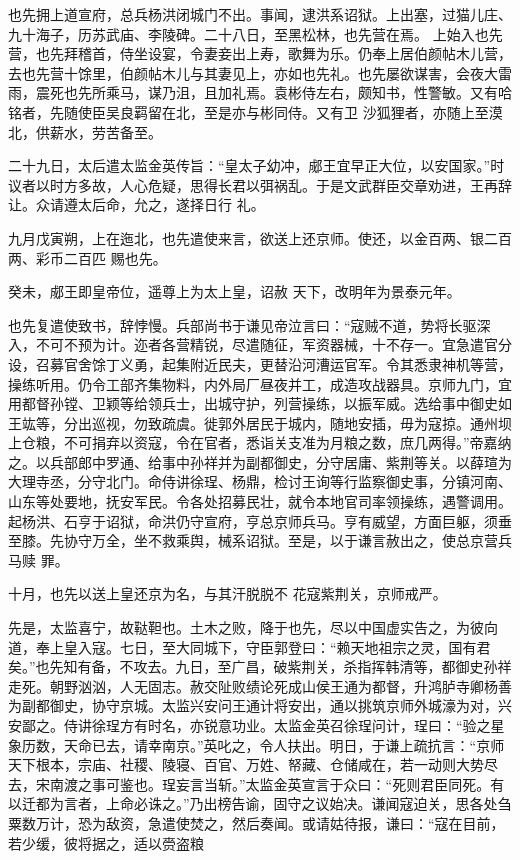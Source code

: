 \documentclass{article}
\begin{document}
也先拥上道宣府，总兵杨洪闭城门不出。事闻，逮洪系诏狱。上出塞，过猫儿庄、九十海子，历苏武庙、李陵碑。二十八日，至黑松林，也先营在焉。
\newpage
上始入也先营，也先拜稽首，侍坐设宴，令妻妾出上寿，歌舞为乐。仍奉上居伯颜帖木儿营，去也先营十馀里，伯颜帖木儿与其妻见上，亦如也先礼。也先屡欲谋害，会夜大雷雨，震死也先所乘马，谋乃沮，且加礼焉。袁彬侍左右，颇知书，性警敏。又有哈铭者，先随使臣吴良羁留在北，至是亦与彬同侍。又有卫
沙狐狸者，亦随上至漠北，供薪水，劳苦备至。 

二十九日，太后遣太监金英传旨：“皇太子幼冲，郕王宜早正大位，以安国家。”时议者以时方多故，人心危疑，思得长君以弭祸乱。于是文武群臣交章劝进，王再辞让。众请遵太后命，允之，遂择日行
礼。 

九月戊寅朔，上在迤北，也先遣使来言，欲送上还京师。使还，以金百两、银二百两、彩币二百匹
赐也先。 

癸未，郕王即皇帝位，遥尊上为太上皇，诏赦
天下，改明年为景泰元年。 

\newpage

也先复遣使致书，辞悖慢。兵部尚书于谦见帝泣言曰：“寇贼不道，势将长驱深入，不可不预为计。迩者各营精锐，尽遣随征，军资器械，十不存一。宜急遣官分设，召募官舍馀丁义勇，起集附近民夫，更替沿河漕运官军。令其悉隶神机等营，操练听用。仍令工部齐集物料，内外局厂昼夜并工，成造攻战器具。京师九门，宜用都督孙镗、卫颖等给领兵士，出城守护，列营操练，以振军威。选给事中御史如王竑等，分出巡视，勿致疏虞。徙郭外居民于城内，随地安插，毋为寇掠。通州坝上仓粮，不可捐弃以资寇，令在官者，悉诣关支准为月粮之数，庶几两得。”帝嘉纳之。以兵部郎中罗通、给事中孙祥并为副都御史，分守居庸、紫荆等关。以薛瑄为大理寺丞，分守北门。命侍讲徐珵、杨鼎，检讨王询等行监察御史事，分镇河南、山东等处要地，抚安军民。令各处招募民壮，就令本地官司率领操练，遇警调用。起杨洪、石亨于诏狱，命洪仍守宣府，亨总京师兵马。亨有威望，方面巨躯，须垂至膝。先协守万全，坐不救乘舆，械系诏狱。至是，以于谦言赦出之，使总京营兵马赎
罪。 

\newpage

十月，也先以送上皇还京为名，与其汗脱脱不
花寇紫荆关，京师戒严。 

先是，太监喜宁，故鞑靼也。土木之败，降于也先，尽以中国虚实告之，为彼向道，奉上皇入寇。七日，至大同城下，守臣郭登曰：“赖天地祖宗之灵，国有君矣。”也先知有备，不攻去。九日，至广昌，破紫荆关，杀指挥韩清等，都御史孙祥走死。朝野汹汹，人无固志。赦交阯败绩论死成山侯王通为都督，升鸿胪寺卿杨善为副都御史，协守京城。太监兴安问王通计将安出，通以挑筑京师外城濠为对，兴安鄙之。侍讲徐珵方有时名，亦锐意功业。太监金英召徐珵问计，珵曰：“验之星象历数，天命已去，请幸南京。”英叱之，令人扶出。明日，于谦上疏抗言：“京师天下根本，宗庙、社稷、陵寝、百官、万姓、帑藏、仓储咸在，若一动则大势尽去，宋南渡之事可鉴也。珵妄言当斩。”太监金英宣言于众曰：“死则君臣同死。有以迁都为言者，上命必诛之。”乃出榜告谕，固守之议始决。谦闻寇迫关，思各处刍粟数万计，恐为敌资，急遣使焚之，然后奏闻。或请姑待报，谦曰：“寇在目前，若少缓，彼将据之，适以赍盗粮
\newpage
\end{document}
